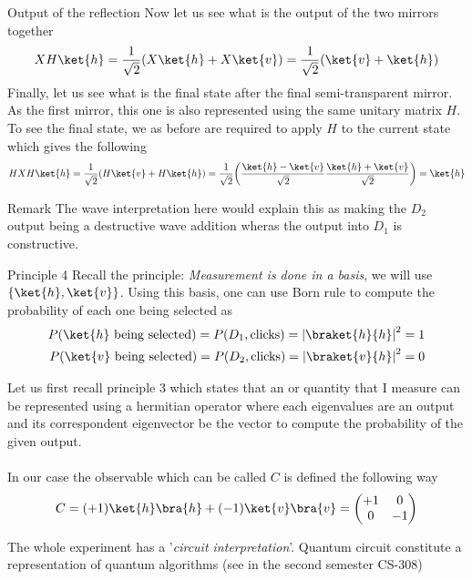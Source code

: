 	\begin{parag}{Output of the reflection}
	    Now let us see what is the output of the two mirrors together
		\begin{align*} 
			XH \ket{h} = \frac{1}{\sqrt{2}} \left(X \ket{h} + X \ket{v}\right) = \frac{1}{\sqrt{2}} \left(\ket{v} + \ket{h}\right)
		\end{align*}
		Finally, let us see what is the final state after the final semi-transparent mirror. As the first mirror, this one is also represented using the same unitary matrix $H$. To see the final state, we as before are required to apply $H$ to the current state which gives the following 
		\begin{align*} 
			HXH \ket{h} = \frac{1}{\sqrt{2}} \left(H \ket{v} + H \ket{h}\right) =  \frac{1}{\sqrt{2}} \left(\frac{\ket{h} - \ket{v}}{\sqrt{2}} \frac{\ket{h} + \ket{v}}{\sqrt{2}}\right) = \ket{h}
		\end{align*}
		\begin{subparag}{Remark}
		The wave interpretation here would explain this as making the $D_2$ output being a destructive wave addition wheras the output into $D_1$ is constructive.
		\end{subparag}
	\end{parag}
	\begin{parag}{Principle 4}
	    Recall the principle: \textit{Measurement is done in a basis}, we will use $\left\{\ket{h}, \ket{v}\right\}$. Using this basis, one can use Born rule to compute the probability of each one being selected as 
		\begin{align*} 
			P\left(\ket{h} \text{ being selected}\right) = P\left(D_1, \text{clicks}\right) = \left|\braket{h}{h}\right|^2 =  1\\
			P\left(\ket{v} \text{ being selected}\right) = P\left(D_2, \text{clicks}\right) = \left|\braket{v}{h}\right|^2 =  0
		\end{align*}

	\end{parag}


	\begin{framedremark}
	Let us first recall principle 3 which states that an  or quantity that I measure can be represented using a hermitian operator where each eigenvalues are an output and its correspondent eigenvector be the vector to compute the probability of the given output.\\
	$ $\\
	In our case the observable which can be called $C$ is defined the following way 
	\begin{align*} 
		C = \left(+1\right) \ket{h}\bra{h} + \left(-1\right)\ket{v}\bra{v}  = \begin{pmatrix} +1 & 0 \\ 0 & -1 \end{pmatrix} 
	\end{align*}
	\end{framedremark}
	\begin{framedremark}
	The whole experiment has a '\textit{circuit interpretation}'. Quantum circuit constitute a representation of quantum algorithms (see in the second semester CS-308)
	\end{framedremark}
	
